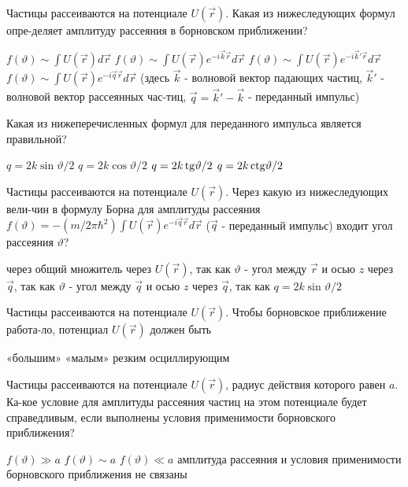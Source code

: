 \documentclass[11pt,a4paper]{exam}
\begin{document}
\begin{questions}

\question Частицы рассеиваются на потенциале $U(\vec r)$. Какая из нижеследующих формул опре-деляет амплитуду рассеяния в борновском приближении?
\begin{choices}
\choice $f(\vartheta ) \sim \int {U(\vec r)d\vec r} $         
\choice $f(\vartheta ) \sim \int {U(\vec r){e^{ - i\vec k\vec r}}d\vec r} $
\choice $f(\vartheta ) \sim \int {U(\vec r){e^{ - i\vec k'\vec r}}d\vec r} $    
\choice $f(\vartheta ) \sim \int {U(\vec r){e^{ - i\vec q\vec r}}d\vec r} $
(здесь $\vec k$ - волновой вектор падающих частиц, $\vec k'$ - волновой вектор рассеянных час-тиц, $\vec q = \vec k' - \vec k$ - переданный импульс)
\end{choices}

\question Какая из нижеперечисленных формул для переданного импульса является правильной?
\begin{choices}
\choice $q = 2k\sin \vartheta /2$  
\choice $q = 2k\cos \vartheta /2$  
\choice $q = 2k\,{\rm{tg}}\vartheta /2$  
\choice $q = 2k\,{\rm{ctg}}\vartheta /2$
\end{choices}

\question Частицы рассеиваются на потенциале $U(\vec r)$. Через какую из нижеследующих вели-чин в формулу Борна для амплитуды рассеяния $f(\vartheta ) =  - (m/2\pi {\hbar ^2})\int {U(\vec r){e^{ - i\vec q\vec r}}d\vec r} $ ($\vec q$ - переданный импульс) входит угол рассеяния $\vartheta $?
\begin{choices}
\choice через общий множитель
\choice через $U(\vec r)$, так как $\vartheta $ - угол между $\vec r$ и осью $z$
\choice через $\vec q$, так как $\vartheta $ - угол между $\vec q$ и осью $z$
\choice через $\vec q$, так как $q = 2k\sin \vartheta /2$
\end{choices}

\question Частицы рассеиваются на потенциале $U(\vec r)$. Чтобы борновское приближение работа-ло, потенциал $U(\vec r)$ должен быть
\begin{choices}
\choice «большим»      
\choice «малым»     
\choice резким      
\choice осциллирующим
\end{choices}

\question Частицы рассеиваются на потенциале $U(\vec r)$, радиус действия которого равен $a$. Ка-кое условие для амплитуды рассеяния частиц на этом потенциале будет справедливым, если выполнены условия применимости борновского приближения?
\begin{choices}
\choice $f(\vartheta ) \gg a$
\choice $f(\vartheta ) \sim a$
\choice $f(\vartheta ) \ll a$
\choice амплитуда рассеяния и условия применимости борновского приближения не связаны
\end{choices}


\end{questions}
\end{document}
